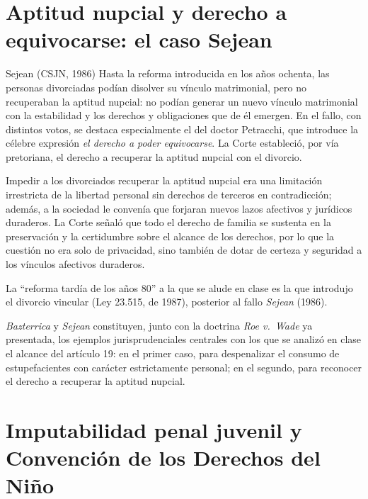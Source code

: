 \documentclass[12pt,oneside]{book}
\begin{document}
\section{Aptitud nupcial y derecho a equivocarse: el caso Sejean}

\begin{example}{Sejean (CSJN, 1986)}
Hasta la reforma introducida en los años ochenta, las personas divorciadas podían disolver su vínculo matrimonial, pero no recuperaban la aptitud nupcial: no podían generar un nuevo vínculo matrimonial con la estabilidad y los derechos y obligaciones que de él emergen. En el fallo, con distintos votos, se destaca especialmente el del doctor Petracchi, que introduce la célebre expresión \emph{el derecho a poder equivocarse}. La Corte estableció, por vía pretoriana, el derecho a recuperar la aptitud nupcial con el divorcio.
\end{example}

\begin{important}
Impedir a los divorciados recuperar la aptitud nupcial era una limitación irrestricta de la libertad personal sin derechos de terceros en contradicción; además, a la sociedad le convenía que forjaran nuevos lazos afectivos y jurídicos duraderos. La Corte señaló que todo el derecho de familia se sustenta en la preservación y la certidumbre sobre el alcance de los derechos, por lo que la cuestión no era solo de privacidad, sino también de dotar de certeza y seguridad a los vínculos afectivos duraderos.
\end{important}

\begin{note}
La ``reforma tardía de los años 80'' a la que se alude en clase es la que introdujo el divorcio vincular (Ley 23.515, de 1987), posterior al fallo \emph{Sejean} (1986).
\end{note}

\emph{Bazterrica} y \emph{Sejean} constituyen, junto con la doctrina \emph{Roe v.\ Wade} ya presentada, los ejemplos jurisprudenciales centrales con los que se analizó en clase el alcance del artículo 19: en el primer caso, para despenalizar el consumo de estupefacientes con carácter estrictamente personal; en el segundo, para reconocer el derecho a recuperar la aptitud nupcial.

\section{Imputabilidad penal juvenil y Convención de los Derechos del Niño}
\end{document}
